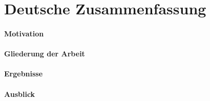 \section*{Deutsche Zusammenfassung}

\paragraph{Motivation}

\paragraph{Gliederung der Arbeit}

\paragraph{Ergebnisse}

\paragraph{Ausblick}


